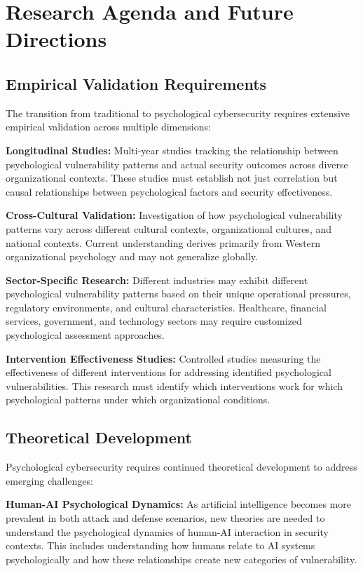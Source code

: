\documentclass[10pt, twocolumn]{article}
\begin{document}
\section{Research Agenda and Future Directions}

\subsection{Empirical Validation Requirements}

The transition from traditional to psychological cybersecurity requires extensive empirical validation across multiple dimensions:

\textbf{Longitudinal Studies:} Multi-year studies tracking the relationship between psychological vulnerability patterns and actual security outcomes across diverse organizational contexts. These studies must establish not just correlation but causal relationships between psychological factors and security effectiveness.

\textbf{Cross-Cultural Validation:} Investigation of how psychological vulnerability patterns vary across different cultural contexts, organizational cultures, and national contexts. Current understanding derives primarily from Western organizational psychology and may not generalize globally.

\textbf{Sector-Specific Research:} Different industries may exhibit different psychological vulnerability patterns based on their unique operational pressures, regulatory environments, and cultural characteristics. Healthcare, financial services, government, and technology sectors may require customized psychological assessment approaches.

\textbf{Intervention Effectiveness Studies:} Controlled studies measuring the effectiveness of different interventions for addressing identified psychological vulnerabilities. This research must identify which interventions work for which psychological patterns under which organizational conditions.

\subsection{Theoretical Development}

Psychological cybersecurity requires continued theoretical development to address emerging challenges:

\textbf{Human-AI Psychological Dynamics:} As artificial intelligence becomes more prevalent in both attack and defense scenarios, new theories are needed to understand the psychological dynamics of human-AI interaction in security contexts. This includes understanding how humans relate to AI systems psychologically and how these relationships create new categories of vulnerability.
\end{document}
